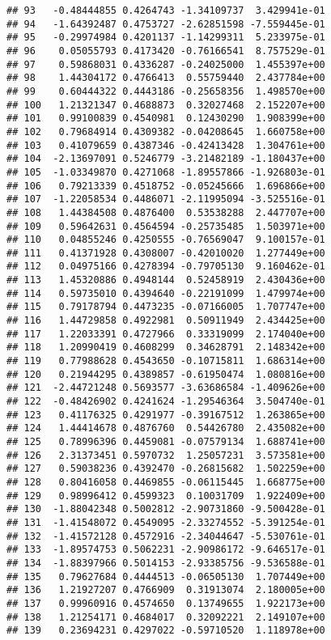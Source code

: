\documentclass[
]{article}
\begin{document}
\begin{verbatim}
## 93   -0.48444855 0.4264743 -1.34109737  3.429941e-01
## 94   -1.64392487 0.4753727 -2.62851598 -7.559445e-01
## 95   -0.29974984 0.4201137 -1.14299311  5.233975e-01
## 96    0.05055793 0.4173420 -0.76166541  8.757529e-01
## 97    0.59868031 0.4336287 -0.24025000  1.455397e+00
## 98    1.44304172 0.4766413  0.55759440  2.437784e+00
## 99    0.60444322 0.4443186 -0.25658356  1.498570e+00
## 100   1.21321347 0.4688873  0.32027468  2.152207e+00
## 101   0.99100839 0.4540981  0.12430290  1.908399e+00
## 102   0.79684914 0.4309382 -0.04208645  1.660758e+00
## 103   0.41079659 0.4387346 -0.42413428  1.304761e+00
## 104  -2.13697091 0.5246779 -3.21482189 -1.180437e+00
## 105  -1.03349870 0.4271068 -1.89557866 -1.926803e-01
## 106   0.79213339 0.4518752 -0.05245666  1.696866e+00
## 107  -1.22058534 0.4486071 -2.11995094 -3.525516e-01
## 108   1.44384508 0.4876400  0.53538288  2.447707e+00
## 109   0.59642631 0.4564594 -0.25735485  1.503971e+00
## 110   0.04855246 0.4250555 -0.76569047  9.100157e-01
## 111   0.41371928 0.4308007 -0.42010020  1.277449e+00
## 112   0.04975166 0.4278394 -0.79705130  9.160462e-01
## 113   1.45320886 0.4948144  0.52458919  2.430436e+00
## 114   0.59735010 0.4394640 -0.22191099  1.479974e+00
## 115   0.79178794 0.4473235 -0.07166005  1.707747e+00
## 116   1.44729858 0.4922981  0.50911949  2.434425e+00
## 117   1.22033391 0.4727966  0.33319099  2.174040e+00
## 118   1.20990419 0.4608299  0.34628791  2.148342e+00
## 119   0.77988628 0.4543650 -0.10715811  1.686314e+00
## 120   0.21944295 0.4389857 -0.61950474  1.080816e+00
## 121  -2.44721248 0.5693577 -3.63686584 -1.409626e+00
## 122  -0.48426902 0.4241624 -1.29546364  3.504740e-01
## 123   0.41176325 0.4291977 -0.39167512  1.263865e+00
## 124   1.44414678 0.4876760  0.54426780  2.435082e+00
## 125   0.78996396 0.4459081 -0.07579134  1.688741e+00
## 126   2.31373451 0.5970732  1.25057231  3.573581e+00
## 127   0.59038236 0.4392470 -0.26815682  1.502259e+00
## 128   0.80416058 0.4469855 -0.06115445  1.668775e+00
## 129   0.98996412 0.4599323  0.10031709  1.922409e+00
## 130  -1.88042348 0.5002812 -2.90731860 -9.500428e-01
## 131  -1.41548072 0.4549095 -2.33274552 -5.391254e-01
## 132  -1.41572128 0.4572916 -2.34044647 -5.530761e-01
## 133  -1.89574753 0.5062231 -2.90986172 -9.646517e-01
## 134  -1.88397966 0.5014153 -2.93385756 -9.536588e-01
## 135   0.79627684 0.4444513 -0.06505130  1.707449e+00
## 136   1.21927207 0.4766909  0.31913074  2.180005e+00
## 137   0.99960916 0.4574650  0.13749655  1.922173e+00
## 138   1.21254171 0.4684017  0.32092221  2.149107e+00
## 139   0.23694231 0.4297022 -0.59710520  1.118978e+00

\end{verbatim}
\end{document}
